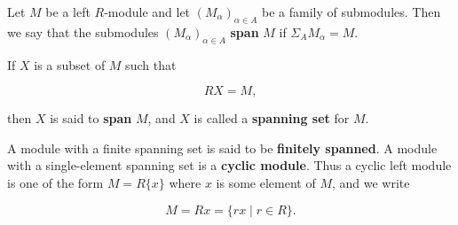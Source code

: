Let $M$ be a left $R$-module and let $(M_\alpha)_{\alpha \in A}$ be a family of submodules. Then we say that the submodules $(M_\alpha)_{\alpha \in A}$ \textbf{span} $M$ if $\Sigma_A M_\alpha = M$.

If $X$ is a subset of $M$ such that

$$RX = M,$$

then $X$ is said to \textbf{span} $M$, and $X$ is called a \textbf{spanning set} for $M$.

A module with a finite spanning set is said to be \textbf{finitely spanned}. A module with a single-element spanning set is a \textbf{cyclic module}. Thus a cyclic left module is one of the form $M = R\{x\}$ where $x$ is some element of $M$, and we write

$$M = Rx = \{rx \mid r \in R\}.$$
